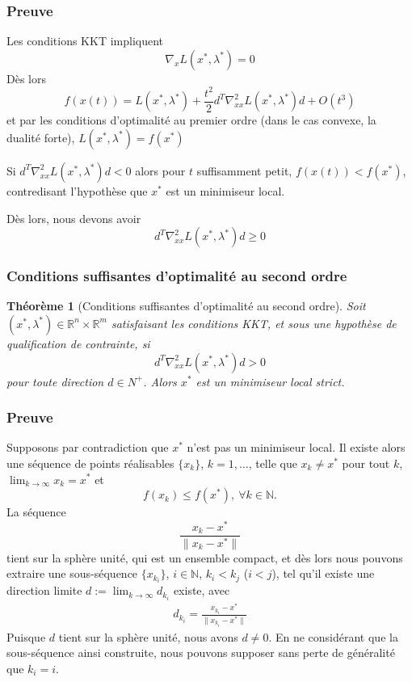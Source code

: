 \documentclass[usepdftitle=false]{beamer}
\newtheorem{thm}{Théorème}
\def\NN{\mathbb{N}}
\def\RR{\mathbb{R}}
\begin{document}
\begin{frame}
\frametitle{Preuve}

Les conditions KKT impliquent
$$
\nabla_x L(x^*, \lambda^*) = 0
$$
Dès lors
$$
f(x(t)) = L(x^*, \lambda^*) + \frac{t^2}{2} d^T \nabla_{xx}^2 L(x^*, \lambda^*) d + O(t^3)
$$
et par les conditions d'optimalité au premier ordre (dans le cas convexe, la dualité forte), $L(x^*, \lambda^*) = f(x^*)$

\mbox{}

Si $d^T \nabla_{xx}^2 L(x^*, \lambda^*) d < 0$ alors pour $t$ suffisamment petit, $f(x(t)) < f(x^*)$, contredisant l'hypothèse que $x^*$ est un minimiseur local.

\mbox{}

Dès lors, nous devons avoir
$$
d^T \nabla_{xx}^2 L(x^*, \lambda^*) d \geq 0
$$

\end{frame}

\begin{frame}
\frametitle{Conditions suffisantes d'optimalité au second ordre}

\begin{thm}[Conditions suffisantes d'optimalité au second ordre]
Soit $(x^*, \lambda^*) \in \RR^n \times \RR^m$ satisfaisant les conditions KKT, et sous une hypothèse de qualification de contrainte, si
$$
d^T \nabla^2_{xx} L(x^*, \lambda^*)d > 0
$$
pour toute  direction $d \in N^+$.
Alors $x^*$ est un minimiseur local strict.
\end{thm}

\end{frame}

\begin{frame}
\frametitle{Preuve}

Supposons par contradiction que $x^*$ n'est pas un minimiseur local.
Il existe alors une séquence de points réalisables $\{ x_k \}$, $k = 1,\ldots$, telle que
$x_k \ne x^*$ pour tout $k$, $\lim_{k \rightarrow \infty} x_k = x^*$ et
$$
f(x_k) \leq f(x^*),\ \forall k \in \NN.
$$
La séquence
$$
\frac{x_k-x^*}{\| x_k-x^* \|}
$$
tient sur la sphère unité, qui est un ensemble compact, et dès lors nous pouvons extraire une sous-séquence $\{ x_{k_i} \}$, $i \in \NN$, $k_i < k_j$ ($i < j$), tel qu'il existe une direction limite $d := \lim_{k \rightarrow \infty} d_{k_i}$ existe, avec
\begin{align*}
d_{k_i} = \frac{x_{k_i}-x^*}{\| x_{k_i}-x^* \|}
\end{align*}
Puisque $d$ tient sur la sphère unité, nous avons $d \ne 0$.
En ne considérant que la sous-séquence ainsi construite, nous pouvons supposer sans perte de généralité que $k_i = i$.

\end{frame}
\end{document}
